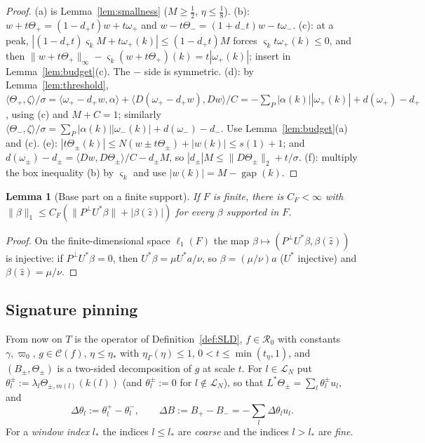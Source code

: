 \documentclass[10pt]{amsart}
\newtheorem{lemma}[theorem]{Lemma}
\theoremstyle{definition}
\theoremstyle{remark}
\newcommand{\Cset}{\mathcal C}
\newcommand{\gap}{\operatorname{gap}}
\newcommand{\zh}{\hat z}
\newcommand{\ip}[2]{\langle #1,#2\rangle}
\begin{document}
\begin{proof}
(a) is Lemma~\ref{lem:smallness} ($M\ge\frac12$, $\eta\le\frac18$).  (b):
$w+t\Theta_+=(1-d_+t)w+t\omega_+$ and $w-t\Theta_-=(1+d_-t)w-t\omega_-$.
(c): at a peak, $|(1-d_+t)\varsigma_kM+t\omega_+(k)|\le(1-d_+t)M$ forces
$\varsigma_kt\omega_+(k)\le0$, and then $\|w+t\Theta_+\|_\infty-\varsigma_k
(w+t\Theta_+)(k)=t|\omega_+(k)|$; insert in Lemma~\ref{lem:budget}(c).  The
$-$ side is symmetric.  (d): by Lemma~\ref{lem:threshold},
$\ip{\Theta_+}{\zeta}/\sigma=\ip{\omega_+-d_+w}{\alpha}+\ip{D(\omega_+-d_+w)}
{Dw}/C=-\sum_P|\alpha(k)||\omega_+(k)|+d(\omega_+)-d_+$, using (c) and
$M+C=1$; similarly $\ip{\Theta_-}{\zeta}/\sigma=\sum_P|\alpha(k)||
\omega_-(k)|+d(\omega_-)-d_-$.  Use Lemma~\ref{lem:budget}(a) and (c).
(e): $|t\Theta_\pm(k)|\le N(w\pm t\Theta_\pm)+|w(k)|\le s(1)+1$; and
$d(\omega_\pm)-d_\pm=\ip{Dw}{D\Theta_\pm}/C-d_\pm M$, so $|d_\pm|M\le
\|D\Theta_\pm\|_2+t/\sigma$.  (f): multiply the box inequality (b) by
$\varsigma_k$ and use $|w(k)|=M-\gap(k)$.
\end{proof}

\begin{lemma}[Base part on a finite support]\label{lem:finitebase}
If $F$ is finite, there is $C_F<\infty$ with $\|\beta\|_1\le C_F(\|P^\perp
U^*\beta\|+|\beta(\zh)|)$ for every $\beta$ supported in $F$.
\end{lemma}

\begin{proof}
On the finite-dimensional space $\ell_1(F)$ the map $\beta\mapsto
(P^\perp U^*\beta,\beta(\zh))$ is injective: if $P^\perp U^*\beta=0$, then
$U^*\beta=\mu U^*a/\nu$, so $\beta=(\mu/\nu)a$ ($U^*$ injective) and
$\beta(\zh)=\mu/\nu$.
\end{proof}

\subsection{Signature pinning}
From now on $T$ is the operator of Definition~\ref{def:SLD}, $f\in
\mathcal R_0$ with constants $\gamma,\varpi_0$, $g\in\Cset(f)$,
$\eta\le\eta_*$ with $\eta_\Gamma(\eta)\le1$, $0<t\le\min(t_\eta,1)$, and
$(B_\pm,\Theta_\pm)$ is a two-sided decomposition of $g$ at scale $t$.  For
$l\in\mathcal L_N$ put $\theta^\pm_l:=\lambda_l\Theta_{\pm,m(l)}(k(l))$ (and
$\theta^\pm_l:=0$ for $l\notin\mathcal L_N$), so that $L^*\Theta_\pm=
\sum_l\theta^\pm_lu_l$, and
\[
 \Delta\theta_l:=\theta^+_l-\theta^-_l,\qquad \Delta B:=B_+-B_-=-\sum_l\Delta\theta_lu_l .
\]
For a \emph{window index} $l_*$ the indices $l\le l_*$ are \emph{coarse}
and the indices $l>l_*$ are \emph{fine}.
\end{document}

